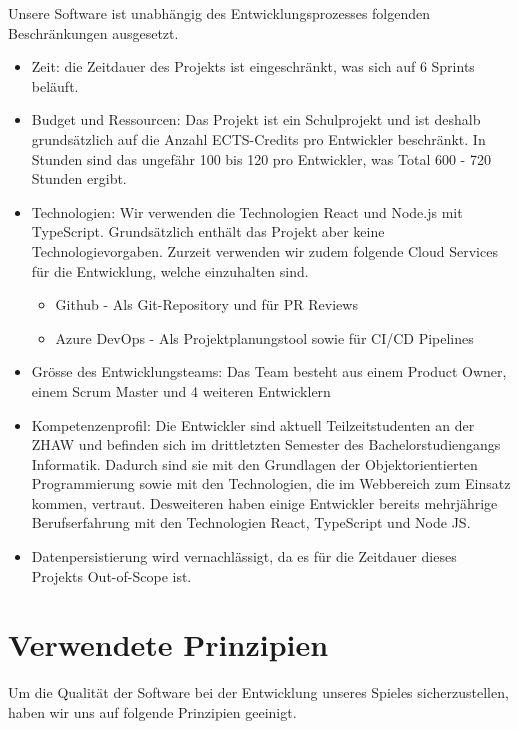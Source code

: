 \documentclass[11pt,a4paper]{scrartcl}
\let\oldsection\section
\renewcommand\section{\clearpage\oldsection}
\begin{document}
Unsere Software ist unabhängig des Entwicklungsprozesses folgenden Beschränkungen ausgesetzt.
\begin{itemize}
  \item Zeit: die Zeitdauer des Projekts ist eingeschränkt, was sich auf 6 Sprints beläuft.
  \item Budget und Ressourcen: Das Projekt ist ein Schulprojekt und ist deshalb grundsätzlich auf die Anzahl ECTS-Credits pro Entwickler beschränkt. In Stunden sind das ungefähr 100 bis 120 pro Entwickler, was Total 600 - 720 Stunden ergibt.
  \item Technologien: Wir verwenden die Technologien React und Node.js mit TypeScript. Grundsätzlich enthält das Projekt aber keine Technologievorgaben. Zurzeit verwenden wir zudem folgende Cloud Services für die Entwicklung, welche einzuhalten sind.
        \begin{itemize}
          \item Github - Als Git-Repository und für PR Reviews
          \item Azure DevOps - Als Projektplanungstool sowie für CI/CD Pipelines
        \end{itemize}
  \item Grösse des Entwicklungsteams: Das Team besteht aus einem Product Owner, einem Scrum Master und 4 weiteren Entwicklern
  \item Kompetenzenprofil: Die Entwickler sind aktuell Teilzeitstudenten an der ZHAW und befinden sich im drittletzten Semester des Bachelorstudiengangs Informatik. Dadurch sind sie mit den Grundlagen der Objektorientierten Programmierung sowie mit den Technologien, die im Webbereich zum Einsatz kommen, vertraut. Desweiteren haben einige Entwickler bereits mehrjährige Berufserfahrung mit den Technologien React, TypeScript und Node JS.
  \item Datenpersistierung wird vernachlässigt, da es für die Zeitdauer dieses Projekts Out-of-Scope ist.
\end{itemize}

\section{Verwendete Prinzipien}
Um die Qualität der Software bei der Entwicklung unseres Spieles sicherzustellen, haben wir uns auf folgende Prinzipien geeinigt.
\end{document}

